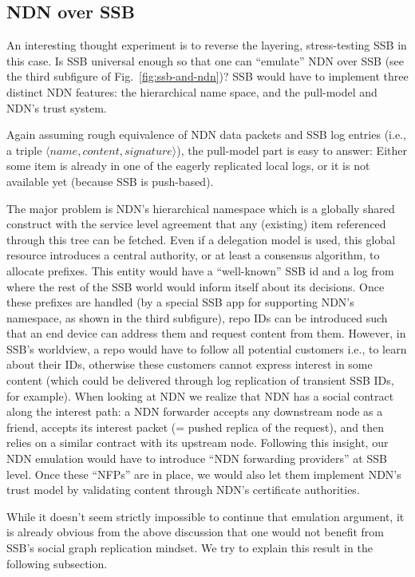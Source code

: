 \documentclass[sigconf]{acmart}
\begin{document}
\subsection{NDN over SSB}

An interesting thought experiment is to reverse the layering,
stress-testing SSB in this case. Is SSB universal enough so that one
can ``emulate'' NDN over SSB (see the third subfigure of
Fig.~\ref{fig:ssb-and-ndn})? SSB would have to implement three
distinct NDN features: the hierarchical name space, and the pull-model
and NDN's trust system.

Again assuming rough equivalence of NDN data packets and SSB log
entries (i.e., a triple $\langle name,content,signature\rangle$), the
pull-model part is easy to answer: Either some item is already in one
of the eagerly replicated local logs, or it is not available yet
(because SSB is push-based).

The major problem is NDN's hierarchical namespace which is a globally
shared construct with the service level agreement that any (existing)
item referenced through this tree can be fetched.  Even if a
delegation model is used, this global resource introduces a central
authority, or at least a consensus algorithm, to allocate
prefixes. This entity would have a ``well-known'' SSB id and a log
from where the rest of the SSB world would inform itself about its
decisions. Once these prefixes are handled (by a special SSB app for
supporting NDN's namespace, as shown in the third subfigure), repo IDs
can be introduced such that an end device can address them and request
content from them. However, in SSB's worldview, a repo would have to
follow all potential customers i.e., to learn about their IDs,
otherwise these customers cannot express interest in some content
(which could be delivered through log replication of transient SSB
IDs, for example). When looking at NDN we realize that NDN has a
social contract along the interest path: a NDN forwarder accepts any
downstream node as a friend, accepts its interest packet (= pushed
replica of the request), and then relies on a similar contract with
its upstream node. Following this insight, our NDN emulation would
have to introduce ``NDN forwarding providers'' at SSB level. Once
these ``NFPs'' are in place, we would also let them implement
NDN's trust model by validating content through NDN's certificate
authorities.

While it doesn't seem strictly impossible to continue that emulation
argument, it is already obvious from the above discussion that one
would not benefit from SSB's social graph replication mindset. We try
to explain this result in the following subsection.
\end{document}
